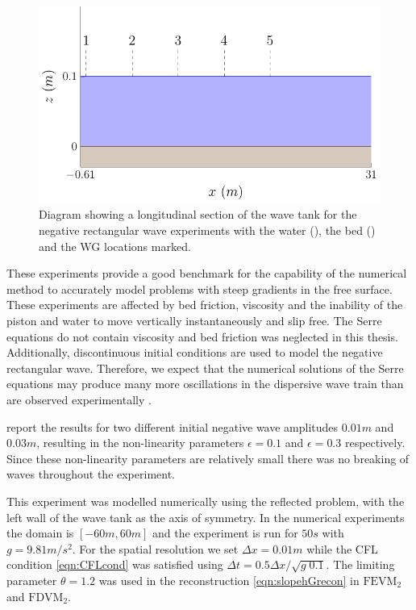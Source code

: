 \begin{figure}
	\centering
	\includegraphics[width=\textwidth]{./chp6/figures/Experiment/Segur/WaveTank.pdf}
	\caption{Diagram showing a longitudinal section of the wave tank for the negative rectangular wave experiments with the water (), the bed () and the WG locations marked.}
	\label{fig:SegurWT}
\end{figure} 

These experiments provide a good benchmark for the capability of the numerical method to accurately model problems with steep gradients in the free surface. These experiments are affected by bed friction, viscosity and the inability of the piston and water to move vertically instantaneously and slip free. The Serre equations do not contain viscosity and bed friction was neglected in this thesis. Additionally, discontinuous initial conditions are used to model the negative rectangular wave. Therefore, we expect that the numerical solutions of the Serre equations may produce many more oscillations in the dispersive wave train than are observed experimentally \cite{Pitt-2018-61}.

\citet{Hammack-Segur-1978-337} report the results for two different initial negative wave amplitudes $0.01m$ and $0.03m$, resulting in the non-linearity parameters $\epsilon = 0.1$ and $\epsilon=0.3$ respectively. Since these non-linearity parameters are relatively small there was no breaking of waves throughout the experiment.

This experiment was modelled numerically using the reflected problem, with the left wall of the wave tank as the axis of symmetry. In the numerical experiments the domain is $[-60m,60m]$ and the experiment is run for $ 50s$ with $g = 9.81m/s^2$. For the spatial resolution we set $\Delta x = 0.01m$ while the CFL condition \eqref{eqn:CFLcond} was satisfied using $\Delta t = 0.5 \Delta x / \sqrt{g \; 0.1}$. The limiting parameter $\theta = 1.2$ was used in the reconstruction \eqref{eqn:slopehGrecon} in $\text{FEVM}_2$ and $\text{FDVM}_2$.

